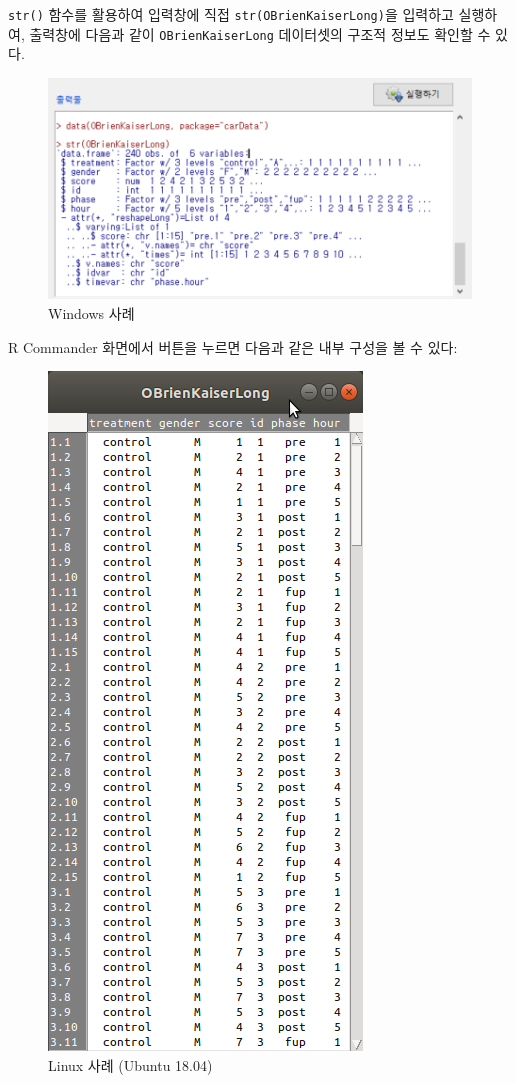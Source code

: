 \documentclass[
]{book}
\begin{document}
\texttt{str()} 함수를 활용하여 입력창에 직접 \texttt{str(OBrienKaiserLong)}을 입력하고 실행하여, 출력창에 다음과 같이 \texttt{OBrienKaiserLong} 데이터셋의 구조적 정보도 확인할 수 있다.

\begin{figure}
\centering
\includegraphics{fig/dataset-obrienlong-03.png}
\caption{Windows 사례}
\end{figure}

R Commander 화면에서 버튼을 누르면 다음과 같은 내부 구성을 볼 수 있다:

\begin{figure}
\centering
\includegraphics{fig/dataset-obrienlong-04.png}
\caption{Linux 사례 (Ubuntu 18.04)}
\end{figure}
\end{document}
